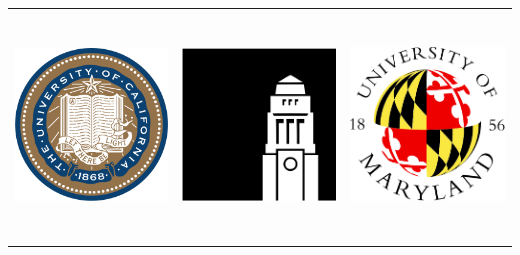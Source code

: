 \documentclass[landscape,a0b,final]{a0poster}
\begin{document}
\vspace*{1cm}



\begin{center}

\hspace*{-9cm}
\begin{minipage}[c][9cm][c]{0.1\textwidth}
  \begin{center}
    \begin{tabular}{ccc}
    \includegraphics[height=6cm,angle=0]{ucseal.pdf} &
    \includegraphics[height=6cm,angle=0]{leeds.png} &
    \includegraphics[height=6cm,angle=0]{maryland.png} 

\end{tabular}
\end{center}
\end{minipage}
\end{center}
\end{document}
